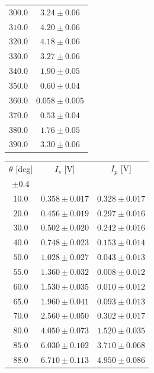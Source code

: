 \documentclass[10pt,oneside,a4paper]{article}
\begin{document}
\begin{table}[H]
\begin{tabular}{cc}
  $300.0$ &$ 3.24 \pm 0.06$ \\
  $310.0$ &$ 4.20 \pm 0.06$ \\
  $320.0$ &$ 4.18 \pm 0.06$ \\
  $330.0$ &$ 3.27 \pm 0.06$ \\
  $340.0$ &$ 1.90 \pm 0.05$ \\
  $350.0$ &$ 0.60 \pm 0.04$ \\
  $360.0$ &$ 0.058 \pm 0.005$ \\
  $370.0$ &$ 0.53 \pm 0.04$ \\
  $380.0$ &$ 1.76 \pm 0.05$ \\
  $390.0$ &$ 3.30 \pm 0.06$ \\
\hline
\end{tabular}
\end{table}





\begin{table}[H]
\centering
{}
\label{tab:brewster}
\begin{tabular}{ccc}
\hline
 $\theta$ [deg]& $I_s$ [V]&$I_p$ [V]\\
 $\pm 0.4$ & &\\
\hline
   $10.0   $&  $ 0.358 \pm 0.017   $&$ 0.328 \pm 0.017 $\\
   $20.0   $&  $ 0.456 \pm 0.019   $&$ 0.297 \pm 0.016 $\\
   $30.0   $&  $ 0.502 \pm 0.020   $&$ 0.242 \pm 0.016 $\\
   $40.0   $&  $ 0.748 \pm 0.023   $&$ 0.153 \pm 0.014 $\\
   $50.0   $&  $ 1.028 \pm 0.027   $&$ 0.043 \pm 0.013 $\\
   $55.0   $&  $ 1.360 \pm 0.032   $&$ 0.008 \pm 0.012 $\\
   $60.0   $&  $ 1.530 \pm 0.035   $&$ 0.010 \pm 0.012 $\\
   $65.0   $&  $ 1.960 \pm 0.041   $&$ 0.093 \pm 0.013 $\\
   $70.0   $&  $ 2.560 \pm 0.050   $&$ 0.302 \pm 0.017 $\\
   $80.0   $&  $ 4.050 \pm 0.073   $&$ 1.520 \pm 0.035 $\\
   $85.0   $&  $ 6.030 \pm 0.102   $&$ 3.710 \pm 0.068 $\\
   $88.0   $&  $ 6.710 \pm 0.113   $&$ 4.950 \pm 0.086 $\\
\hline
\end{tabular}
\end{table}
\end{document}
